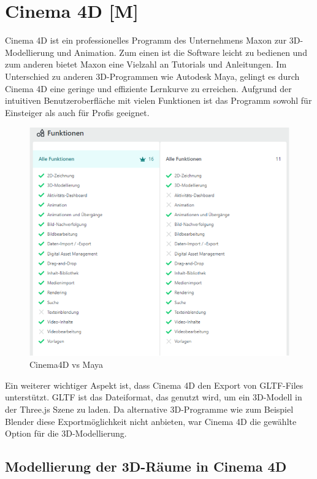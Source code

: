 \section{Cinema 4D [M]}
Cinema 4D ist ein professionelles Programm des Unternehmens Maxon zur 3D-Modellierung und Animation. Zum einen ist die Software leicht zu bedienen und zum anderen bietet Maxon eine Vielzahl an Tutorials und Anleitungen. Im Unterschied zu anderen 3D-Programmen wie Autodesk Maya, gelingt es durch Cinema 4D eine geringe und effiziente Lernkurve zu erreichen. Aufgrund der intuitiven Benutzeroberfläche mit vielen Funktionen ist das Programm sowohl für Einsteiger als auch für Profis geeignet. \cite{Cinema4D}

\begin{figure} [h t]
    \centering
    \includegraphics[scale=0.7]{pics/c4d-vs-maya.PNG}
    \caption{Cinema4D vs Maya \cite{C4DvsMaya}}
    \label{fig:tech:front:c4d-vs-maya}
  \end{figure}

Ein weiterer wichtiger Aspekt ist, dass Cinema 4D den Export von GLTF-Files unterstützt. GLTF ist das Dateiformat, das genutzt wird, um ein 3D-Modell in der Three.js Szene zu laden. Da alternative 3D-Programme wie zum Beispiel Blender diese Exportmöglichkeit nicht anbieten, war Cinema 4D die gewählte Option für die 3D-Modellierung.   

\subsection{Modellierung der 3D-Räume in Cinema 4D}


